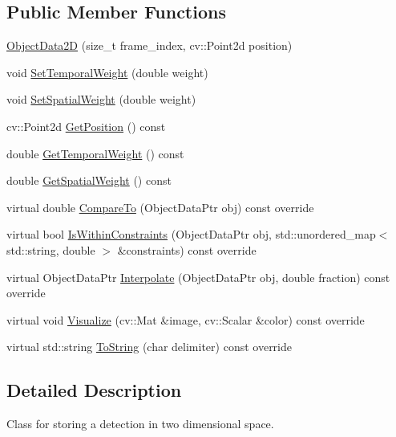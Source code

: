 \subsection*{Public Member Functions}
\begin{DoxyCompactItemize}
\item 
\hyperlink{classcore_1_1ObjectData2D_adc35e5b8597ea47ad3568259c2e800c6}{Object\+Data2D} (size\+\_\+t frame\+\_\+index, cv\+::\+Point2d position)
\item 
void \hyperlink{classcore_1_1ObjectData2D_a2850785393bc7a5250427bbda84c1b58}{Set\+Temporal\+Weight} (double weight)
\item 
void \hyperlink{classcore_1_1ObjectData2D_ad62bf8b2362e8f3547f8040a144fa346}{Set\+Spatial\+Weight} (double weight)
\item 
cv\+::\+Point2d \hyperlink{classcore_1_1ObjectData2D_ab3c0694ec38f2d59a4092f46f876498b}{Get\+Position} () const
\item 
double \hyperlink{classcore_1_1ObjectData2D_a35381efb292d20f2b181558c129269f3}{Get\+Temporal\+Weight} () const
\item 
double \hyperlink{classcore_1_1ObjectData2D_a688087ccdd999d7e16f5c68cc460209d}{Get\+Spatial\+Weight} () const
\item 
virtual double \hyperlink{classcore_1_1ObjectData2D_a68d56bd5f26a41830a87ae32eabf9126}{Compare\+To} (Object\+Data\+Ptr obj) const override
\item 
virtual bool \hyperlink{classcore_1_1ObjectData2D_a63e855919a72462225a8e69140f1389b}{Is\+Within\+Constraints} (Object\+Data\+Ptr obj, std\+::unordered\+\_\+map$<$ std\+::string, double $>$ \&constraints) const override
\item 
virtual Object\+Data\+Ptr \hyperlink{classcore_1_1ObjectData2D_a59b974e09f74f0a2640e3152893fe79f}{Interpolate} (Object\+Data\+Ptr obj, double fraction) const override
\item 
virtual void \hyperlink{classcore_1_1ObjectData2D_aff4e8539559f4ce50a7f43b733d6c512}{Visualize} (cv\+::\+Mat \&image, cv\+::\+Scalar \&color) const override
\item 
virtual std\+::string \hyperlink{classcore_1_1ObjectData2D_a72b2f50ca82ebd9269e1c29cdac6d92a}{To\+String} (char delimiter) const override
\end{DoxyCompactItemize}


\subsection{Detailed Description}
Class for storing a detection in two dimensional space. 

